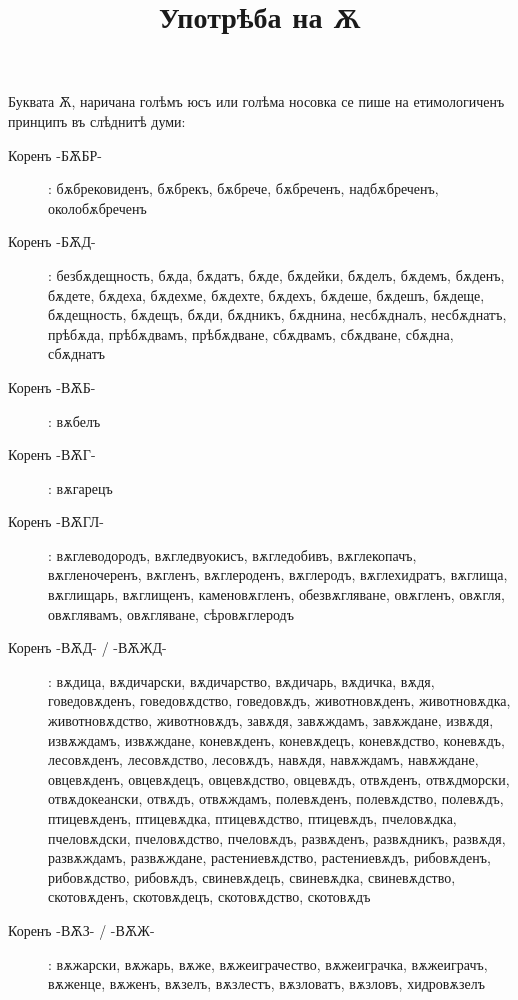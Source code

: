 \documentclass{article}
\begin{document}
	\title{Употрѣба на Ѫ}
	\maketitle
	    
	Буквата Ѫ, наричана голѣмъ юсъ или голѣма носовка се пише на етимологиченъ принципъ въ слѣднитѣ думи:
 
 	\begin{description}
 		\item [Коренъ -БѪБР-]: бѫбрековиденъ, бѫбрекъ, бѫбрече, бѫбреченъ, надбѫбреченъ, околобѫбреченъ
 		\item[Коренъ -БѪД-]: безбѫдещность, бѫда, бѫдатъ, бѫде, бѫдейки, бѫделъ, бѫдемъ, бѫденъ, бѫдете, бѫдеха, бѫдехме, бѫдехте, бѫдехъ, бѫдеше, бѫдешъ, бѫдеще, бѫдещность, бѫдещъ, бѫди, бѫдникъ, бѫднина, несбѫдналъ, несбѫднатъ, прѣбѫда, прѣбѫдвамъ, прѣбѫдване, сбѫдвамъ, сбѫдване, сбѫдна, сбѫднатъ
 		
 		\item[Коренъ -ВѪБ-]: вѫбелъ
 		
 		\item[Коренъ -ВѪГ-]: вѫгарецъ
 		
 		\item[Коренъ -ВѪГЛ-]: вѫглеводородъ, вѫгледвуокисъ, вѫгледобивъ, вѫглекопачъ, вѫгленочеренъ, вѫгленъ, вѫглероденъ, вѫглеродъ, вѫглехидратъ, вѫглища, вѫглищарь, вѫглищенъ, каменовѫгленъ, обезвѫгляване, овѫгленъ, овѫгля, овѫглявамъ, овѫгляване, сѣровѫглеродъ
 		\item[Коренъ -ВѪД- / -ВѪЖД-] : вѫдица, вѫдичарски, вѫдичарство, вѫдичарь, вѫдичка, вѫдя, говедовѫденъ, говедовѫдство, говедовѫдъ, животновѫденъ, животновѫдка, животновѫдство, животновѫдъ, завѫдя, завѫждамъ, завѫждане, извѫдя, извѫждамъ, извѫждане, коневѫденъ, коневѫдецъ, коневѫдство, коневѫдъ, лесовѫденъ, лесовѫдство, лесовѫдъ, навѫдя, навѫждамъ, навѫждане, овцевѫденъ, овцевѫдецъ, овцевѫдство, овцевѫдъ, отвѫденъ, отвѫдморски, отвѫдокеански, отвѫдъ, отвѫждамъ, полевѫденъ, полевѫдство, полевѫдъ, птицевѫденъ, птицевѫдка, птицевѫдство, птицевѫдъ, пчеловѫдка, пчеловѫдски, пчеловѫдство, пчеловѫдъ, развѫденъ, развѫдникъ, развѫдя, развѫждамъ, развѫждане, растениевѫдство, растениевѫдъ, рибовѫденъ, рибовѫдство, рибовѫдъ, свиневѫдецъ, свиневѫдка, свиневѫдство, %
 		скотовѫденъ, скотовѫдецъ, скотовѫдство, скотовѫдъ

    	\item[Коренъ -ВѪЗ- / -ВѪЖ-]: вѫжарски, вѫжарь, вѫже, вѫжеиграчество, вѫжеиграчка, вѫжеиграчъ, вѫженце, вѫженъ, вѫзелъ, вѫзлестъ, вѫзловатъ, вѫзловъ, хидровѫзелъ


\end{description}
\end{document}
